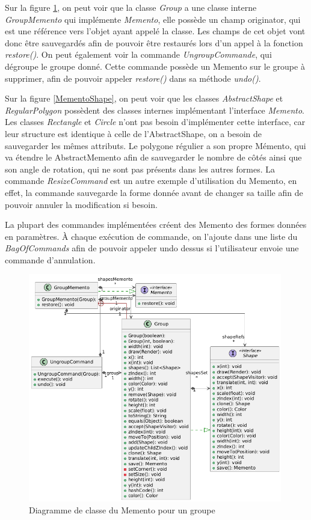 \documentclass{article}
\begin{document}
Sur la figure \ref{MementoGroupe}, on peut voir que la classe \textit{Group} a une classe interne \textit{GroupMemento} qui implémente \textit{Memento}, 
elle possède un champ originator, qui est une référence vers l'objet ayant appelé la classe. Les champs de cet objet vont donc être sauvegardés afin de pouvoir
être restaurés lors d'un appel à la fonction \textit{restore()}. 
On peut également voir la commande \textit{UngroupCommande}, qui dégroupe le groupe donné. Cette commande possède un Memento sur le groupe à supprimer,
afin de pouvoir appeler \textit{restore()} dans sa méthode \textit{undo()}.

Sur la figure \ref{MementoShape}, on peut voir que les classes \textit{AbstractShape} et \textit{RegularPolygon} possèdent des classes internes implémentant
l'interface \textit{Memento}.  Les classes \textit{Rectangle} et \textit{Circle} n'ont pas besoin d'implémenter cette interface, car leur structure est identique à celle
de l'AbstractShape, on a besoin de sauvegarder les mêmes attributs. Le polygone régulier a son propre Mémento, qui va étendre le AbstractMemento 
afin de sauvegarder le nombre de côtés ainsi que son angle de rotation, qui ne sont pas présents dans les autres formes.
La commande \textit{ResizeCommand} est un autre exemple d'utilisation du Memento, en effet, la commande sauvegarde la forme donnée avant de
changer sa taille afin de pouvoir annuler la modification si besoin.

La plupart des commandes implémentées créent des Memento des formes données en paramètres. À chaque exécution de commande, on l'ajoute dans une liste du
\textit{BagOfCommands} afin de pouvoir appeler undo dessus si l'utilisateur envoie une commande d'annulation.
\begin{figure}[h]
    \centering
    \includegraphics[width=\textwidth,height=10.0cm,keepaspectratio]{memento.png}
    \caption{Diagramme de classe du Memento pour un groupe}
    \label{MementoGroupe}
\end{figure}
\FloatBarrier
\end{document}
